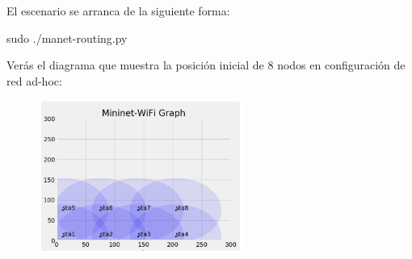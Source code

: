 \documentclass[12pt, a4paper]{report}
\begin{document}
El escenario se arranca de la siguiente forma:
\begin{center}
	sudo ./manet-routing.py
\end{center}
Verás el diagrama que muestra la posición inicial de 8 nodos en configuración de red ad-hoc:
\begin{figure}[H]
	\centering
	\includegraphics[width=0.6\textwidth]{enunciado4}
\end{figure}
\end{document}
